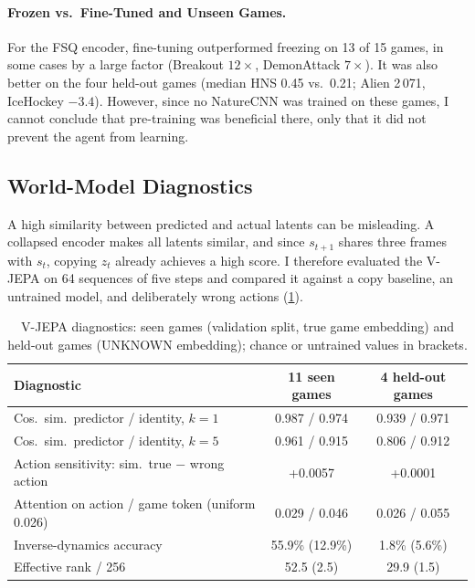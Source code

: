 \documentclass[runningheads]{llncs}
\begin{document}
\paragraph{Frozen vs.\ Fine-Tuned and Unseen Games.} For the FSQ encoder, fine-tuning
outperformed freezing on 13 of 15 games, in some cases by a large factor (Breakout $12\times$,
DemonAttack $7\times$). It was also better on the four held-out games (median HNS 0.45 vs.\
0.21; Alien 2\,071, IceHockey $-3.4$). However, since no NatureCNN was trained on these games, I
cannot conclude that pre-training was beneficial there, only that it did not prevent the agent
from learning.

\subsection{World-Model Diagnostics}
\label{sec:jepa-diag}

A high similarity between predicted and actual latents can be misleading. A collapsed encoder
makes all latents similar, and since $s_{t+1}$ shares three frames with $s_t$, copying $z_t$
already achieves a high score. I therefore evaluated the V-JEPA on 64 sequences of five steps
and compared it against a copy baseline, an untrained model, and deliberately wrong actions
(\cref{tab:jepa}).

\begin{table}[t]
\centering
\caption{V-JEPA diagnostics: seen games (validation split, true game embedding) and held-out
games (UNKNOWN embedding); chance or untrained values in brackets.}
\label{tab:jepa}
\footnotesize\setlength{\tabcolsep}{4pt}
\begin{tabular}{@{}lcc@{}}
\toprule
Diagnostic & 11 seen games & 4 held-out games \\
\midrule
Cos.\ sim.\ predictor / identity, $k=1$ & 0.987 / 0.974 & 0.939 / 0.971 \\
Cos.\ sim.\ predictor / identity, $k=5$ & 0.961 / 0.915 & 0.806 / 0.912 \\
Action sensitivity: sim.\ true $-$ wrong action & +0.0057 & +0.0001 \\
Attention on action / game token (uniform 0.026) & 0.029 / 0.046 & 0.026 / 0.055 \\
Inverse-dynamics accuracy & 55.9\% (12.9\%) & 1.8\% (5.6\%) \\
Effective rank / 256 & 52.5 (2.5) & 29.9 (1.5) \\
\bottomrule
\end{tabular}
\end{table}
\end{document}
